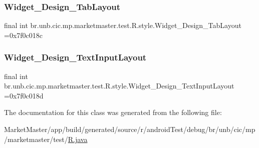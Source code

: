 \subsubsection{\texorpdfstring{Widget\+\_\+\+Design\+\_\+\+Tab\+Layout}{Widget\_Design\_TabLayout}}
{\footnotesize\ttfamily final int br.\+unb.\+cic.\+mp.\+marketmaster.\+test.\+R.\+style.\+Widget\+\_\+\+Design\+\_\+\+Tab\+Layout =0x7f0c018c\hspace{0.3cm}{\ttfamily [static]}}

\mbox{\label{classbr_1_1unb_1_1cic_1_1mp_1_1marketmaster_1_1test_1_1R_1_1style_aa63cfc420aae383606adb3f5f78dca69}} 
\subsubsection{\texorpdfstring{Widget\+\_\+\+Design\+\_\+\+Text\+Input\+Layout}{Widget\_Design\_TextInputLayout}}
{\footnotesize\ttfamily final int br.\+unb.\+cic.\+mp.\+marketmaster.\+test.\+R.\+style.\+Widget\+\_\+\+Design\+\_\+\+Text\+Input\+Layout =0x7f0c018d\hspace{0.3cm}{\ttfamily [static]}}



The documentation for this class was generated from the following file\+:\begin{DoxyCompactItemize}
\item 
Market\+Master/app/build/generated/source/r/android\+Test/debug/br/unb/cic/mp/marketmaster/test/\mbox{\hyperlink{androidTest_2debug_2br_2unb_2cic_2mp_2marketmaster_2test_2R_8java}{R.\+java}}\end{DoxyCompactItemize}
